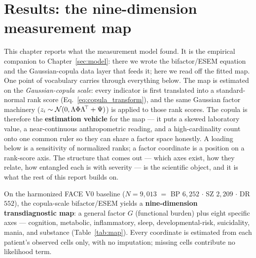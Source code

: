 \section{Results: the nine-dimension measurement map}
\label{sec:results}

This chapter reports what the measurement model found. It is the empirical companion to
Chapter~\ref{sec:model}: there we wrote the bifactor/ESEM equation and the Gaussian-copula data layer that
feeds it; here we read off the fitted map. One point of vocabulary carries through everything below. The map is
estimated on the \emph{Gaussian-copula scale}: every indicator is first translated into a standard-normal rank
score (Eq.~\eqref{eq:copula_transform}), and the same Gaussian factor machinery
($z_i\sim\mathcal{N}(0,\Lambda\Phi\Lambda^{\!\top}+\Psi)$) is applied to those rank scores. The copula is therefore the
\textbf{estimation vehicle} for the map --- it puts a skewed laboratory value, a near-continuous anthropometric
reading, and a high-cardinality count onto one common ruler so they can share a factor space honestly. A
loading below is a sensitivity of normalized ranks; a factor coordinate is a position on a rank-score axis. The
structure that comes out --- which axes exist, how they relate, how entangled each is with severity --- is the
scientific object, and it is what the rest of this report builds on.

On the harmonized FACE V0 baseline ($N=9{,}013$ $=$ BP $6{,}252$ $\cdot$ SZ $2{,}209$ $\cdot$ DR $552$), the
copula-scale bifactor/ESEM yields a \textbf{nine-dimension transdiagnostic map}: a general factor $G$
(functional burden) plus eight specific axes --- cognition, metabolic, inflammatory, sleep, developmental-risk,
suicidality, mania, and substance (Table~\ref{tab:map}). Every coordinate is estimated from each patient's
observed cells only, with no imputation; missing cells contribute no likelihood term.

